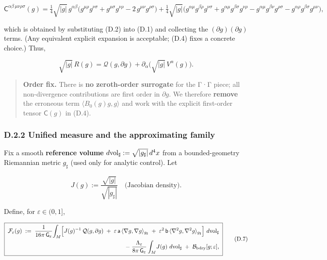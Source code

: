\documentclass[
]{article}
\numberwithin{equation}{section}
\begin{document}
\[
\mathsf C^{\alpha\beta\,\mu\nu\rho\sigma}(g)
=\tfrac14\sqrt{|g|}\,g^{\alpha\beta}\Big(
g^{\mu\rho}g^{\nu\sigma}+g^{\mu\sigma}g^{\nu\rho}-2\,g^{\mu\nu}g^{\rho\sigma}
\Big)
+\tfrac14\sqrt{|g|}\Big(
g^{\alpha\mu}g^{\beta\rho}g^{\nu\sigma}+g^{\alpha\mu}g^{\beta\sigma}g^{\nu\rho}
-g^{\alpha\mu}g^{\beta\nu}g^{\rho\sigma}-g^{\alpha\rho}g^{\beta\sigma}g^{\mu\nu}
\Big),
\tag{D.4}
\]

which is obtained by substituting (D.2) into (D.1) and collecting the
\((\partial g)(\partial g)\) terms. (Any equivalent explicit expansion
is acceptable; (D.4) fixes a concrete choice.) Thus,

\[
\sqrt{|g|}\,R(g)=\mathcal Q(g,\partial g)+\partial_\alpha\!\big(\sqrt{|g|}\,V^\alpha(g)\big).
\tag{D.5}
\]

\begin{quote}
\textbf{Order fix.} There is \textbf{no zeroth-order surrogate} for the
Γ·Γ piece; all non-divergence contributions are first order in
\(\partial g\). We therefore \textbf{remove} the erroneous term
\(\langle B_0(g)g,g\rangle\) and work with the explicit first-order
tensor \(\mathsf C(g)\) in (D.4).
\end{quote}

\hypertarget{d.2.2-unified-measure-and-the-approximating-family}{%
\subsubsection{D.2.2 Unified measure and the approximating
family}\label{d.2.2-unified-measure-and-the-approximating-family}}

Fix a smooth \textbf{reference volume}
\(d{\rm vol}_\sharp:=\sqrt{|g_\sharp|}\,d^4x\) from a bounded-geometry
Riemannian metric \(g_\sharp\) (used only for analytic control). Let

\[
J(g):=\frac{\sqrt{|g|}}{\sqrt{|g_\sharp|}}\quad\text{(Jacobian density)}.
\tag{D.6}
\]

Define, for \(\varepsilon\in(0,1]\),

\[
\boxed{\;
\begin{aligned}
\mathcal F_\varepsilon(g)\;:=\;\frac{1}{16\pi\,\mathsf G_\varepsilon}\!
\int_M\!\Big[
J(g)^{-1}\,\mathcal Q(g,\partial g)\;+\;\varepsilon\,\mathsf a\,\langle\nabla g,\nabla g\rangle_{g_\sharp}
\;+\;\varepsilon^2\,\mathsf b\,\langle\nabla^2 g,\nabla^2 g\rangle_{g_\sharp}
\Big]\ d{\rm vol}_\sharp \\
-\;\frac{\Lambda_\varepsilon}{8\pi\,\mathsf G_\varepsilon}\int_M\! J(g)\ d{\rm vol}_\sharp\;+\;\mathcal B_{\rm bdry}[g;\varepsilon],
\end{aligned}
\;}
\tag{D.7}
\]
\end{document}
